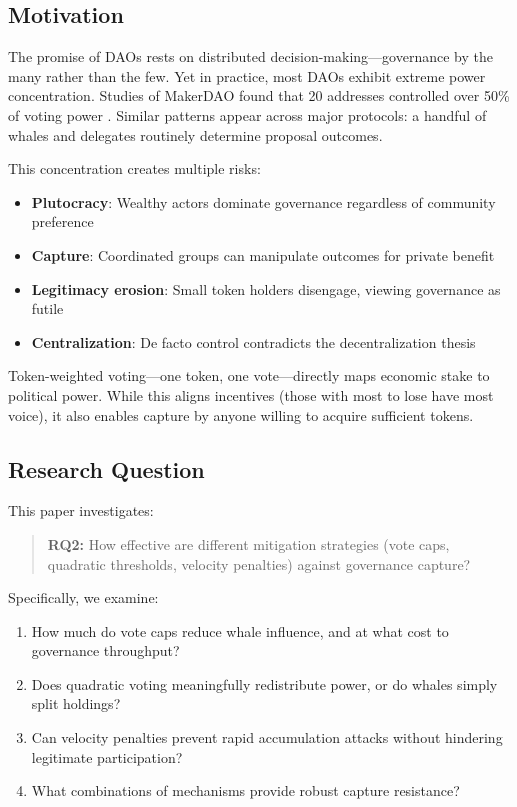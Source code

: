 
\subsection{Motivation}

The promise of DAOs rests on distributed decision-making---governance by the many rather than the few. Yet in practice, most DAOs exhibit extreme power concentration. Studies of MakerDAO found that 20 addresses controlled over 50\% of voting power \citep{fritsch2022analyzing}. Similar patterns appear across major protocols: a handful of whales and delegates routinely determine proposal outcomes.

This concentration creates multiple risks:
\begin{itemize}
    \item \textbf{Plutocracy}: Wealthy actors dominate governance regardless of community preference
    \item \textbf{Capture}: Coordinated groups can manipulate outcomes for private benefit
    \item \textbf{Legitimacy erosion}: Small token holders disengage, viewing governance as futile
    \item \textbf{Centralization}: De facto control contradicts the decentralization thesis
\end{itemize}

Token-weighted voting---one token, one vote---directly maps economic stake to political power. While this aligns incentives (those with most to lose have most voice), it also enables capture by anyone willing to acquire sufficient tokens.

\subsection{Research Question}

This paper investigates:

\begin{quote}
\textbf{RQ2:} How effective are different mitigation strategies (vote caps, quadratic thresholds, velocity penalties) against governance capture?
\end{quote}

Specifically, we examine:
\begin{enumerate}
    \item How much do vote caps reduce whale influence, and at what cost to governance throughput?
    \item Does quadratic voting meaningfully redistribute power, or do whales simply split holdings?
    \item Can velocity penalties prevent rapid accumulation attacks without hindering legitimate participation?
    \item What combinations of mechanisms provide robust capture resistance?
\end{enumerate}


